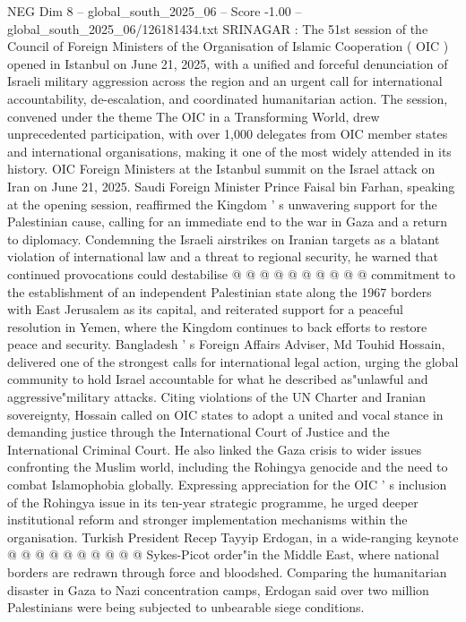 \begin{textsample}{NEG Dim 8 – global\_south\_2025\_06 – Score -1.00 – global\_south\_2025\_06/126181434.txt}  \label{ex:f8_neg_248}
SRINAGAR : The 51st session of the Council of Foreign Ministers of the Organisation of Islamic Cooperation ( OIC ) opened in Istanbul on June 21, 2025, with a unified and forceful denunciation of Israeli military aggression across the region and an urgent call for international accountability, de-escalation, and coordinated humanitarian action.
The session, convened under the theme The OIC in a Transforming World, drew unprecedented participation, with over 1,000 delegates from OIC member states and international organisations, making it one of the most widely attended in its history.
OIC Foreign Ministers at the Istanbul summit on the Israel attack on Iran on June 21, 2025.
Saudi Foreign Minister Prince Faisal bin Farhan, speaking at the opening session, reaffirmed the Kingdom ' s unwavering support for the Palestinian cause, calling for an immediate end to the war in Gaza and a return to diplomacy.
Condemning the Israeli airstrikes on Iranian targets as a blatant violation of international law and a threat to regional security, he warned that continued provocations could destabilise @ @ @ @ @ @ @ @ @ @ commitment to the establishment of an independent Palestinian state along the 1967 borders with East Jerusalem as its capital, and reiterated support for a peaceful resolution in Yemen, where the Kingdom continues to back efforts to restore peace and security.
Bangladesh ' s Foreign Affairs Adviser, Md Touhid Hossain, delivered one of the strongest calls for international legal action, urging the global community to hold Israel accountable for what he described as"unlawful and aggressive"military attacks.
Citing violations of the UN Charter and Iranian sovereignty, Hossain called on OIC states to adopt a united and vocal stance in demanding justice through the International Court of Justice and the International Criminal Court.
He also linked the Gaza crisis to wider issues confronting the Muslim world, including the Rohingya genocide and the need to combat Islamophobia globally.
Expressing appreciation for the OIC ' s inclusion of the Rohingya issue in its ten-year strategic programme, he urged deeper institutional reform and stronger implementation mechanisms within the organisation.
Turkish President Recep Tayyip Erdogan, in a wide-ranging keynote @ @ @ @ @ @ @ @ @ @ Sykes-Picot order"in the Middle East, where national borders are redrawn through force and bloodshed.
Comparing the humanitarian disaster in Gaza to Nazi concentration camps, Erdogan said over two million Palestinians were being subjected to unbearable siege conditions.

\end{textsample}
